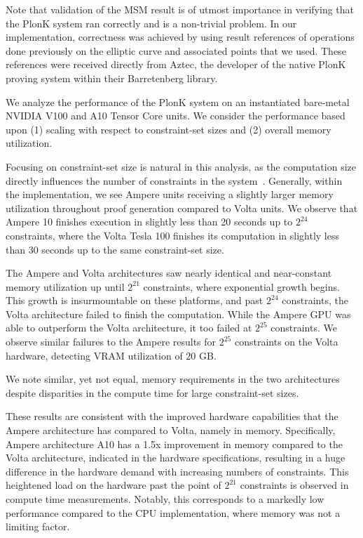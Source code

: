 \documentclass[sigconf]{acmart}
\begin{document}
Note that validation of the MSM result is of utmost importance in verifying that the PlonK system ran correctly and is a non-trivial problem. In our implementation, correctness was achieved by using result references of operations done previously on the elliptic curve and associated points that we used. These references were received directly from Aztec, the developer of the native PlonK proving system within their Barretenberg library.


We analyze the performance of the PlonK system on an instantiated bare-metal NVIDIA V100 and A10 Tensor Core units. We consider the performance based upon (1) scaling with respect to constraint-set sizes and (2) overall memory utilization.

Focusing on constraint-set size is natural in this analysis, as the computation size directly influences the number of constraints in the system~\cite{maxthesis}. Generally, within the implementation, we see Ampere units receiving a slightly larger memory utilization throughout proof generation compared to Volta units. We observe that Ampere 10 finishes execution in slightly less than 20 seconds up to $2^{24}$ constraints, where the Volta Tesla 100 finishes its computation in slightly less than 30 seconds up to the same constraint-set size. 

The Ampere and Volta architectures saw nearly identical and near-constant memory utilization up until $2^{21}$ constraints, where exponential growth begins. This growth is insurmountable on these platforms, and past $2^{24}$ constraints, the Volta architecture failed to finish the computation. While the Ampere GPU was able to outperform the Volta architecture, it too failed at $2^{25}$ constraints. We observe similar failures to the Ampere results for $2^{25}$ constraints on the Volta hardware, detecting VRAM utilization of 20 GB.

We note similar, yet not equal, memory requirements in the two architectures despite disparities in the compute time for large constraint-set sizes. 

These results are consistent with the improved hardware capabilities that the Ampere architecture has compared to Volta, namely in memory. Specifically, Ampere architecture A10 has a 1.5x improvement in memory compared to the Volta architecture, indicated in the hardware specifications,  resulting in a huge difference in the hardware demand with increasing numbers of constraints. This heightened load on the hardware past the point of $2^{21}$ constraints is observed in compute time measurements. Notably, this corresponds to a markedly low performance compared to the CPU implementation, where memory was not a limiting factor. 
\end{document}
